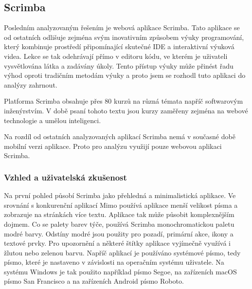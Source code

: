 \subsection{Scrimba}

Posledním analyzovaným řešením je webová aplikace Scrimba. Tato aplikace se od ostatních odlišuje zejména svým inovativním způsobem výuky programování, který kombinuje prostředí připomínající skutečné IDE a interaktivní výuková videa. Lekce se tak odehrávají přímo v editoru kódu, ve kterém je uživateli vysvětlována látka a zadávány úkoly. Tento přístup výuky může přinést řadu výhod oproti tradičním metodám výuky a proto jsem se rozhodl tuto aplikaci do analýzy zahrnout.

Platforma Scrimba obsahuje přes 80 kurzů %
na různá témata napříč softwarovým inženýrstvím. V době psaní tohoto textu jsou kurzy zaměřeny zejména na webové technologie a umělou inteligenci.

Na rozdíl od ostatních analyzovaných aplikací Scrimba nemá v současné době mobilní verzi aplikace. Proto pro analýzu využijí pouze webovou aplikaci Scrimba. 

\subsubsection{Vzhled a uživatelská zkušenost}


Na první pohled působí Scrimba jako přehledná a minimalistická aplikace. Ve srovnání s konkurenční aplikací Mimo používá aplikace menší velikost písma a zobrazuje na stránkách více textu. Aplikace tak může působit komplexnějším dojmem. Co se palety barev týče, používá Scrimba monochromatickou paletu modré barvy. Odstíny modré jsou použity pro pozadí, primární akce, ikony a textové prvky. Pro upozornění a některé štítky aplikace vyjímečně využívá i žlutou nebo zelenou barvu. Napříč aplikací je používáno systémové písmo, tedy písmo, které je nastaveno v závislosti na operačním systému uživatele. Na systému Windows je tak použito například písmo Segoe, na zařízeních macOS písmo San Francisco a na zařízeních Android písmo Roboto.  %


